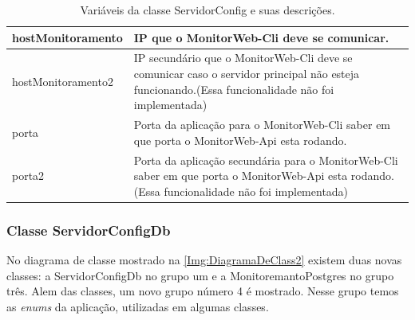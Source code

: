 \begin{table}[H]
\begin{tabular}{|l|l|}
hostMonitoramento                      & \multicolumn{1}{p{10.00cm}|}{IP que o MonitorWeb-Cli deve se comunicar.}\\ \hline
hostMonitoramento2                     & \multicolumn{1}{p{10.00cm}|}{IP secundário que o MonitorWeb-Cli deve se comunicar caso o servidor principal não esteja funcionando.(Essa funcionalidade não foi implementada)} \\ \hline
porta                                  & \multicolumn{1}{p{10.00cm}|}{Porta da aplicação para o MonitorWeb-Cli saber em que porta o MonitorWeb-Api esta rodando.} \\ \hline
porta2                                 & \multicolumn{1}{p{10.00cm}|}{Porta da aplicação secundária para o MonitorWeb-Cli saber em que porta o MonitorWeb-Api esta rodando.(Essa funcionalidade não foi implementada)} \\ \hline
\end{tabular}
\caption[Variáveis da classe ServidorConfig e suas descrições.]{Variáveis da classe ServidorConfig e suas descrições.}
\label{Tab:VariaveisServidorConfig}
\end{table}


\subsubsection{Classe ServidorConfigDb}\label{subsubsec:ClasseServidorConfigDb}

No diagrama de classe mostrado na \autoref{Img:DiagramaDeClass2} existem duas novas classes: a ServidorConfigDb no grupo um e a MonitoremantoPostgres no grupo três. Alem das classes, um novo grupo número 4 é mostrado. Nesse grupo temos as \textit{enums} da aplicação, utilizadas em algumas classes.


